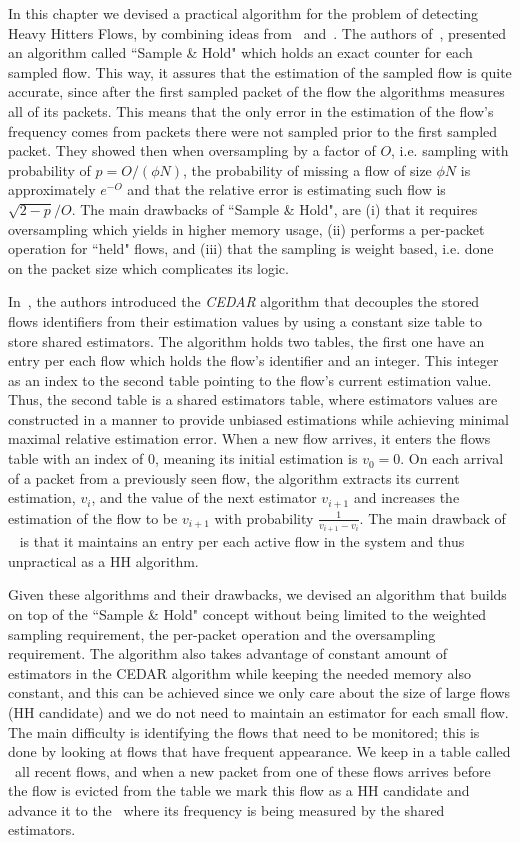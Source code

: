 In this chapter we devised a practical algorithm for the problem of detecting Heavy Hitters Flows, by combining ideas from~\cite{sampleAndHold} and~\cite{CEDAR}. The authors of~\cite{sampleAndHold}, presented an algorithm called ``Sample \& Hold" which holds an exact counter for each sampled flow. This way, it assures that the estimation of the sampled flow is quite accurate, since after the first sampled packet of the flow the algorithms measures all of its packets. This means that the only error in the estimation of the flow's frequency comes from packets there were not sampled prior to the first sampled packet. They showed then when oversampling by a factor of $O$, i.e. sampling with probability of $p=O/(\phi N)$, the probability of missing a flow of size $\phi N$ is approximately $e^{-O}$ and that the relative error is estimating such flow is $\sqrt{2-p}/O$. The main drawbacks of ``Sample \& Hold", are (i) that it requires oversampling which yields in higher memory usage, (ii) performs a per-packet operation for ``held" flows, and (iii) that the sampling is weight based, i.e. done on the packet size which complicates its logic.

In~\cite{CEDAR}, the authors introduced the \textit{CEDAR} algorithm that decouples the stored flows identifiers from their estimation values by using a constant size table to store shared estimators. The algorithm holds two tables, the first one have an entry per each flow which holds the flow's identifier and an integer. This integer as an index to the second table pointing to the flow's current estimation value. Thus, the second table is a shared estimators table, where estimators values are constructed in a manner to provide unbiased estimations while achieving minimal maximal relative estimation error. When a new flow arrives, it enters the flows table with an index of $0$, meaning its initial estimation is $v_0=0$. On each arrival of a packet from a previously seen flow, the algorithm extracts its current estimation, $v_i$, and the value of the next estimator $v_{i+1}$ and increases the estimation of the flow to be $v_{i+1}$ with probability $\frac{1}{v_{i+1}-v_{i}}$. The main drawback of ~\cite{CEDAR} is that it maintains an entry per each active flow in the system and thus unpractical as a HH algorithm.

Given these algorithms and their drawbacks, we devised an algorithm that builds on top of the ``Sample \& Hold" concept without being limited to the weighted sampling requirement, the per-packet operation and the oversampling requirement. The algorithm also takes advantage of constant amount of estimators in the CEDAR algorithm while keeping the needed memory also constant, and this can be achieved since we only care about the size of large flows (HH candidate) and we do not need to maintain an estimator for each small flow. The main difficulty is identifying the flows that need to be monitored; this is done by looking at flows that have frequent appearance. We keep in a table called \sfa\ all recent flows, and when a new packet from one of these flows arrives before the flow is evicted from the table we mark this flow as a HH candidate and advance it to the \cs\ where its frequency is being measured by the shared estimators. 


